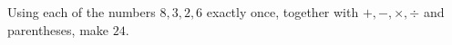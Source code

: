 Using each of the numbers $8,3,2,6$ exactly once, together with $+,-,\times,\div$ and parentheses, make $24$.
